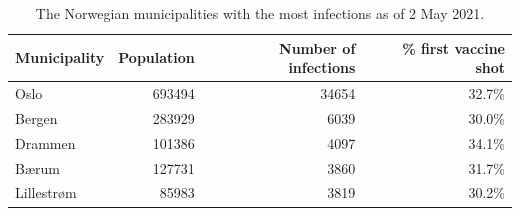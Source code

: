 \begin{table}[H] 
\caption{The Norwegian municipalities with the most infections as of 2 May 2021. \label{top5norway}}
\begin{tabular}{l r r r}
\toprule
\textbf{Municipality}	& \textbf{Population}	& \textbf{Number of infections} &\textbf{\% first vaccine shot} \\
\midrule
Oslo & 693494 & 34654 & 32.7\%\\
Bergen & 283929 & 6039 & 30.0\%\\
Drammen & 101386 & 4097 & 34.1\%\\
Bærum & 127731 & 3860 & 31.7\%\\
Lillestrøm & 85983 & 3819 & 30.2\%\\
\bottomrule
\end{tabular}
\end{table}
\clearpage
